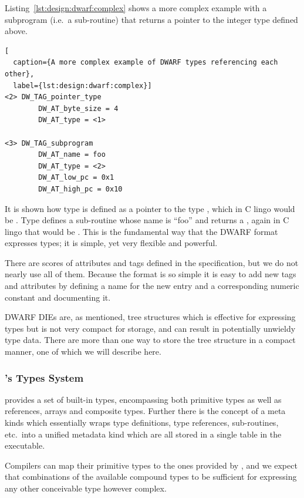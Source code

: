 Listing~\ref{lst:design:dwarf:complex} shows a more complex example with a
subprogram (i.e.~a sub-routine) that returns a pointer to the integer type
defined above.

\begin{lstlisting}[
  caption={A more complex example of DWARF types referencing each other},
  label={lst:design:dwarf:complex}]
<2> DW_TAG_pointer_type
        DW_AT_byte_size = 4
        DW_AT_type = <1>

<3> DW_TAG_subprogram
        DW_AT_name = foo
        DW_AT_type = <2>
        DW_AT_low_pc = 0x1
        DW_AT_high_pc = 0x10
\end{lstlisting}

It is shown how type  is defined as a pointer to the type ,
which in C lingo would be . Type  defines a sub-routine
whose name is ``foo'' and returns a , again in C lingo that would be
. This is the fundamental way that the DWARF format
expresses types; it is simple, yet very flexible and powerful.

There are scores of attributes and tags defined in the specification, but we do
not nearly use all of them. Because the format is so simple it is easy to add
new tags and attributes by defining a name for the new entry and a corresponding
numeric constant and documenting it.

DWARF DIEs are, as mentioned, tree structures which is effective for expressing
types but is not very compact for storage, and can result in potentially
unwieldy type data. There are more than one way to store the tree structure in a
compact manner, one of which we will describe here. %

\subsubsection{\thename{}'s Types System}
\label{sec:design:type-system}

\thename{} provides a set of built-in types, encompassing both primitive types
as well as references, arrays and composite types. Further there is the concept
of a meta kinds which essentially wraps type definitions, type references,
sub-routines, etc.~into a unified metadata kind which are all stored in a single
table in the executable.

Compilers can map their primitive types to the ones provided by \thename{}, and
we expect that combinations of the available compound types to be sufficient for
expressing any other conceivable type however complex.

